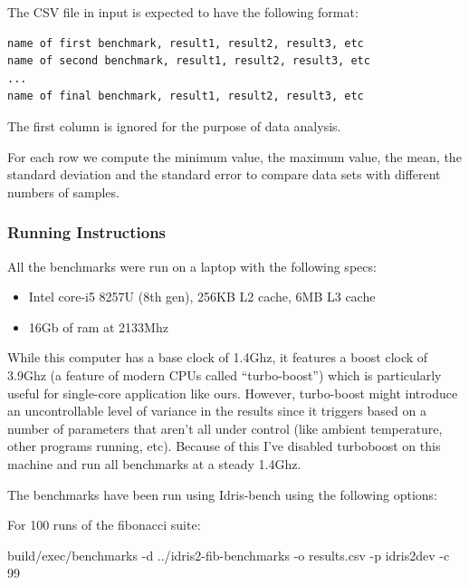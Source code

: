 \documentclass[
]{article}
\newenvironment{Shaded}{}{}
\newcommand{\DecValTok}[1]{\textcolor[rgb]{0.25,0.63,0.44}{#1}}
\newcommand{\NormalTok}[1]{#1}
\newcommand{\OperatorTok}[1]{\textcolor[rgb]{0.40,0.40,0.40}{#1}}
\providecommand{\tightlist}{%
  \setlength{\itemsep}{0pt}\setlength{\parskip}{0pt}}
\begin{document}
The CSV file in input is expected to have the following format:

\begin{verbatim}
name of first benchmark, result1, result2, result3, etc
name of second benchmark, result1, result2, result3, etc
...
name of final benchmark, result1, result2, result3, etc
\end{verbatim}

The first column is ignored for the purpose of data analysis.

For each row we compute the minimum value, the maximum value, the mean,
the standard deviation and the standard error to compare data sets with
different numbers of samples.

\hypertarget{running-instructions}{%
\subsubsection{Running Instructions}\label{running-instructions}}

All the benchmarks were run on a laptop with the following specs:

\begin{itemize}
\tightlist
\item
  Intel core-i5 8257U (8th gen), 256KB L2 cache, 6MB L3 cache
\item
  16Gb of ram at 2133Mhz
\end{itemize}

While this computer has a base clock of 1.4Ghz, it features a boost
clock of 3.9Ghz (a feature of modern CPUs called ``turbo-boost'') which
is particularly useful for single-core application like ours. However,
turbo-boost might introduce an uncontrollable level of variance in the
results since it triggers based on a number of parameters that aren't
all under control (like ambient temperature, other programs running,
etc). Because of this I've disabled turboboost on this machine and run
all benchmarks at a steady 1.4Ghz.

The benchmarks have been run using Idris-bench using the following
options:

For 100 runs of the fibonacci suite:

\begin{Shaded}
\begin{Highlighting}[]
\NormalTok{build}\OperatorTok{/}\NormalTok{exec}\OperatorTok{/}\NormalTok{benchmarks }\OperatorTok{{-}}\NormalTok{d }\OperatorTok{../}\NormalTok{idris2}\OperatorTok{{-}}\NormalTok{fib}\OperatorTok{{-}}\NormalTok{benchmarks }
                      \OperatorTok{{-}}\NormalTok{o results}\OperatorTok{.}\NormalTok{csv }
                      \OperatorTok{{-}}\NormalTok{p idris2dev }
                      \OperatorTok{{-}}\NormalTok{c }\DecValTok{99}
\end{Highlighting}
\end{Shaded}
\end{document}
